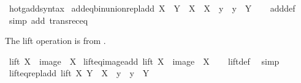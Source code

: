 \begin{isabellebody}
\ hotg{\isacharunderscore}{\kern0pt}add{\isacharunderscore}{\kern0pt}syntax\isanewline
\isanewline
{}\isamarkupfalse%
\ add{\isacharunderscore}{\kern0pt}eq{\isacharunderscore}{\kern0pt}bin{\isacharunderscore}{\kern0pt}union{\isacharunderscore}{\kern0pt}repl{\isacharunderscore}{\kern0pt}add{\isacharcolon}{\kern0pt}\ {\isachardoublequoteopen}X\ {\isacharplus}{\kern0pt}\ Y\ {\isacharequal}{\kern0pt}\ X\ {\isasymunion}\ {\isacharbraceleft}{\kern0pt}X\ {\isacharplus}{\kern0pt}\ y\ {\isacharbar}{\kern0pt}\ y\ {\isasymin}\ Y{\isacharbraceright}{\kern0pt}{\isachardoublequoteclose}\isanewline
%
\isadelimproof
\ \ %
\endisadelimproof
%
\isatagproof
{}\isamarkupfalse%
\ add{\isacharunderscore}{\kern0pt}def\ \isamarkupfalse%
\ {\isacharparenleft}{\kern0pt}simp\ add{\isacharcolon}{\kern0pt}\ transrec{\isacharunderscore}{\kern0pt}eq{\isacharparenright}{\kern0pt}%
\endisatagproof
{\isafoldproof}%
%
\isadelimproof
%
\endisadelimproof
%
\begin{isamarkuptext}%
The lift operation is from \cite{kirby_set_arithemtics}.%
\end{isamarkuptext}\isamarkuptrue%
\isamarkupfalse%
\ {\isachardoublequoteopen}lift\ X\ {\isasymequiv}\ image\ {\isacharparenleft}{\kern0pt}{\isacharparenleft}{\kern0pt}{\isacharplus}{\kern0pt}{\isacharparenright}{\kern0pt}\ X{\isacharparenright}{\kern0pt}{\isachardoublequoteclose}\isanewline
\isanewline
{}\isamarkupfalse%
\ lift{\isacharunderscore}{\kern0pt}eq{\isacharunderscore}{\kern0pt}image{\isacharunderscore}{\kern0pt}add{\isacharcolon}{\kern0pt}\ {\isachardoublequoteopen}lift\ X\ {\isacharequal}{\kern0pt}\ image\ {\isacharparenleft}{\kern0pt}{\isacharparenleft}{\kern0pt}{\isacharplus}{\kern0pt}{\isacharparenright}{\kern0pt}\ X{\isacharparenright}{\kern0pt}{\isachardoublequoteclose}\isanewline
%
\isadelimproof
\ \ %
\endisadelimproof
%
\isatagproof
{}\isamarkupfalse%
\ lift{\isacharunderscore}{\kern0pt}def\ \isamarkupfalse%
\ simp%
\endisatagproof
{\isafoldproof}%
%
\isadelimproof
\isanewline
%
\endisadelimproof
\isanewline
{}\isamarkupfalse%
\ lift{\isacharunderscore}{\kern0pt}eq{\isacharunderscore}{\kern0pt}repl{\isacharunderscore}{\kern0pt}add{\isacharcolon}{\kern0pt}\ {\isachardoublequoteopen}lift\ X\ Y\ {\isacharequal}{\kern0pt}\ {\isacharbraceleft}{\kern0pt}X\ {\isacharplus}{\kern0pt}\ y\ {\isacharbar}{\kern0pt}\ y\ {\isasymin}\ Y{\isacharbraceright}{\kern0pt}{\isachardoublequoteclose}\isanewline
%
\isadelimproof
\ \ %
\endisadelimproof

\end{isabellebody}

